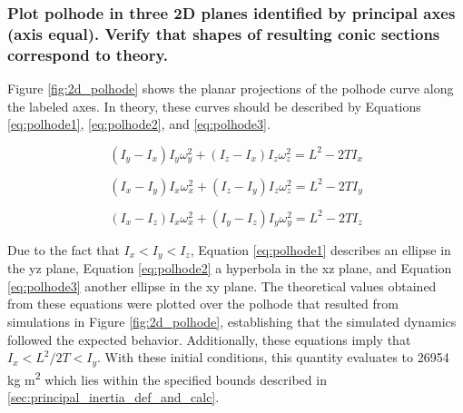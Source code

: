 \subsubsection{Plot polhode in three 2D planes identified by principal axes (axis equal). Verify that shapes of resulting conic sections correspond to theory.}

Figure \ref{fig:2d_polhode} shows the planar projections of the polhode curve along the labeled axes. In theory, these curves should be described by Equations \ref{eq:polhode1}, \ref{eq:polhode2}, and \ref{eq:polhode3}. 

\begin{equation} \label{eq:polhode1}
    (I_y - I_x)I_y \omega_y^2 + (I_z - I_x)I_z \omega_z^2 = L^2 - 2TI_x
\end{equation}

\begin{equation} \label{eq:polhode2}
    (I_x - I_y)I_x \omega_x^2 + (I_z - I_y)I_z \omega_z^2 = L^2 - 2TI_y
\end{equation}

\begin{equation} \label{eq:polhode3}
    (I_x - I_z)I_x \omega_x^2 + (I_y - I_z)I_y \omega_y^2 = L^2 - 2TI_z
\end{equation}

Due to the fact that $I_x < I_y < I_z$, Equation \ref{eq:polhode1} describes an ellipse in the yz plane, Equation \ref{eq:polhode2} a hyperbola in the xz plane, and Equation \ref{eq:polhode3} another ellipse in the xy plane. The theoretical values obtained from these equations were plotted over the polhode that resulted from simulations in Figure \ref{fig:2d_polhode}, establishing that the simulated dynamics followed the expected behavior. Additionally, these equations imply that $I_x < L^2/2T < I_y$. With these initial conditions, this quantity evaluates to 26954 kg m\textsuperscript{2} which lies within the specified bounds described in \ref{sec:principal_inertia_def_and_calc}.

